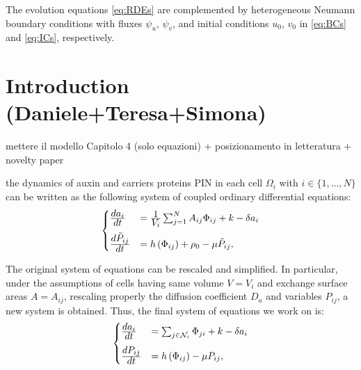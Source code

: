 \documentclass[a4paper]{siamonline220329}
\begin{document}
The evolution equations \cref{eq:RDEs} are complemented by heterogeneous Neumann
boundary conditions with fluxes $\psi_u$, $\psi_v$, and initial
conditions $u_0$, $v_0$ in \cref{eq:BCs} and \cref{eq:ICs}, respectively.


\section{Introduction (Daniele+Teresa+Simona)}

mettere il modello Capitolo 4 (solo equazioni) +  posizionamento in
letteratura + novelty paper


the dynamics of auxin and carriers proteins PIN in each cell $\Omega_i$ with $i \in \{ 1, ..., N \}$ can be written as the following system of coupled ordinary differential equations:
\begin{equation}\begin{aligned}
\begin{cases}
  {\displaystyle d a_i\over\displaystyle d t} & = {\displaystyle 1 \over \displaystyle V_i} \sum_{j=1}^{N} A_{ij} \Phi_{ij} +k - \delta a_i \\[8pt]
  {\displaystyle d \Tilde{P}_{ij}\over\displaystyle d t} & = h\left(\Phi_{ij}\right) + \rho_0 - \mu \Tilde{P}_{ij},
\end{cases}
\end{aligned} \end{equation}


The original system of equations can be rescaled and simplified. In particular, under the assumptions of cells having same volume $V =V_i$ and exchange surface areas $A = A_{ij}$, rescaling properly the diffusion coefficient $D_a$ and variables $P_{ij}$, a new system is obtained. Thus, the final system of equations we work on is:
\begin{equation}\label{eq:Sys_auxPIN}\begin{aligned}
\begin{cases}
  {\displaystyle d a_i\over\displaystyle d t} & = \sum_{j \in \mathcal{N}_i} \displaystyle \Phi_{ji} +k - \delta a_i \\[8pt]
  {\displaystyle d P_{ij}\over\displaystyle d t} & = h\left(\Phi_{ij}\right) - \mu P_{ij},
\end{cases}
\end{aligned} \end{equation}
\end{document}
